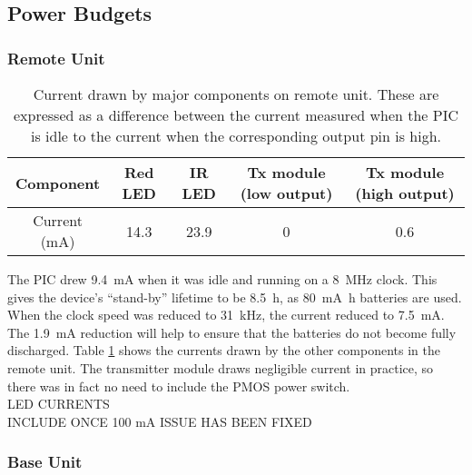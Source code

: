 \subsection{Power Budgets}\label{power budget}
\subsubsection{Remote Unit}

\begin{table}[htbp]
	\begin{center}
	\begin{tabular}{|c|c|c|c|c|}
	\hline
	Component & Red LED & IR LED & Tx module (low output) & Tx module (high output)\\
	\hline
	Current (mA) & 14.3 & 23.9 & 0 & 0.6 \\
	\hline
	\end{tabular}
	\caption{Current drawn by major components on remote unit. These are expressed as a difference between the current measured when the PIC is idle to the current when the corresponding output pin is high.}
	\label{tab: remote current}
	\end{center}
\end{table}

The PIC drew \SI{9.4}{\milli\ampere} when it was idle and running on a \SI{8}{\mega\hertz} clock. This gives the device's ``stand-by'' lifetime to be \SI{8.5}{\hour}, as \SI{80}{\milli\ampere\hour} batteries are used. When the clock speed was reduced to \SI{31}{\kilo\hertz}, the current reduced to \SI{7.5}{\milli\ampere}. The \SI{1.9}{\milli\ampere} reduction will help to ensure that the batteries do not become fully discharged. Table \ref{tab: remote current} shows the currents drawn by the other components in the remote unit. The transmitter module draws negligible current in practice, so there was in fact no need to include the PMOS power switch.\\

LED CURRENTS\\

INCLUDE ONCE 100 mA ISSUE HAS BEEN FIXED\\


\subsubsection{Base Unit}

